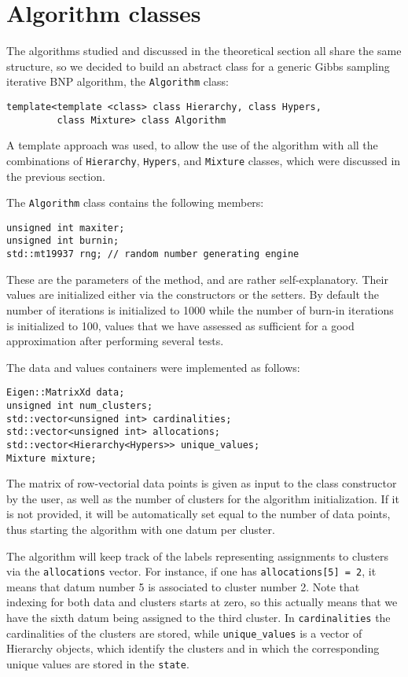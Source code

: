 \chapter{Algorithm classes}

The algorithms studied and discussed in the theoretical section all share the same structure, so we decided to build an abstract class for a generic Gibbs sampling iterative BNP algorithm, the \verb|Algorithm| class:
\begin{verbatim}
template<template <class> class Hierarchy, class Hypers,
         class Mixture> class Algorithm
\end{verbatim}
A template approach was used, to allow the use of the algorithm with all the combinations of \verb|Hierarchy|, \verb|Hypers|, and \verb|Mixture| classes, which were discussed in the previous section.



The \verb|Algorithm| class contains the following members:
\begin{verbatim}
unsigned int maxiter;
unsigned int burnin;
std::mt19937 rng; // random number generating engine
\end{verbatim}
These are the parameters of the method, and are rather self-explanatory.
Their values are initialized either via the constructors or the setters.
By default the number of iterations is initialized to 1000 while the number of burn-in iterations is initialized to 100, values that we have assessed as sufficient for a good approximation after performing several tests.

The data and values containers were implemented as follows:
\begin{verbatim}
Eigen::MatrixXd data;
unsigned int num_clusters;
std::vector<unsigned int> cardinalities;
std::vector<unsigned int> allocations;
std::vector<Hierarchy<Hypers>> unique_values;
Mixture mixture;
\end{verbatim}

The matrix of row-vectorial data points is given as input to the class constructor by the user, as well as the number of clusters for the algorithm initialization. If it is not provided, it will be automatically set equal to the number of data points, thus starting the algorithm with one datum per cluster.

The algorithm will keep track of the labels representing assignments to clusters via the \verb|allocations| vector.
For instance, if one has \verb|allocations[5] = 2|, it means that datum number 5 is associated to cluster number 2.
Note that indexing for both data and clusters starts at zero, so this actually means that we have the sixth datum being assigned to the third cluster. 
In \verb|cardinalities| the cardinalities of the clusters are stored, while \verb|unique_values| is a vector of Hierarchy objects, which identify the clusters and in which the corresponding unique values are stored in the \verb|state|.


